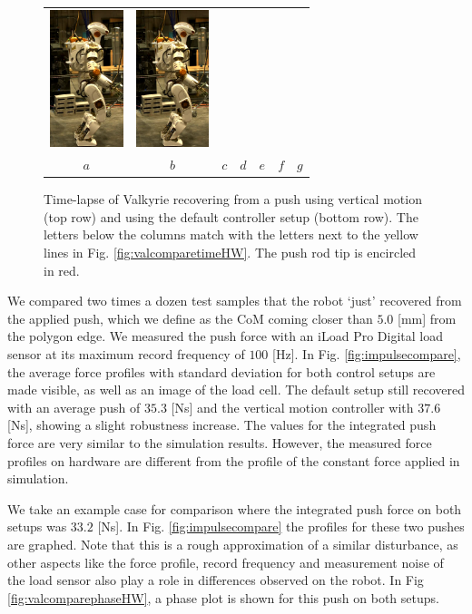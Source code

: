 \documentclass[letterpaper, 10 pt, conference]{ieeeconf}  %
\begin{document}
\begin{figure}[h]
\begin{tabular}{ccccccc}
    \includegraphics[width=0.84in]{val6d} &
    \includegraphics[width=0.84in]{val7d} \\
    $a$&
    $b$&
    $c$&
    $d$&
    $e$&
    $f$&
    $g$\\
  \end{tabular}
  \caption{Time-lapse of Valkyrie recovering from a push using vertical motion (top row) and using the default controller setup (bottom row). The letters below the columns match with the letters next to the yellow lines in Fig. \ref{fig:valcomparetimeHW}. The push rod tip is encircled in red.}
  \label{fig:val}
\end{figure}
We compared two times a dozen test samples that the robot `just' recovered from the applied push, which we define as the CoM coming closer than $5.0$ [mm] from the polygon edge. We measured the push force with an iLoad Pro Digital load sensor at its maximum record frequency of $100$ [Hz]. In Fig. \ref{fig:impulsecompare}, the average force profiles with standard deviation for both control setups are made visible, as well as an image of the load cell. The default setup still recovered with an average push of $35.3$ [Ns] and the vertical motion controller with $37.6$ [Ns], showing a slight robustness increase. The values for the integrated push force are very similar to the simulation results. However, the measured force profiles on hardware are different from the profile of the constant force applied in simulation.

We take an example case for comparison where the integrated push force on both setups was $33.2$ [Ns]. In Fig. \ref{fig:impulsecompare} the profiles for these two pushes are graphed. Note that this is a rough approximation of a similar disturbance, as other aspects like the force profile, record frequency and measurement noise of the load sensor also play a role in differences observed on the robot. In Fig \ref{fig:valcomparephaseHW}, a phase plot is shown for this push on both setups. 
\end{document}

